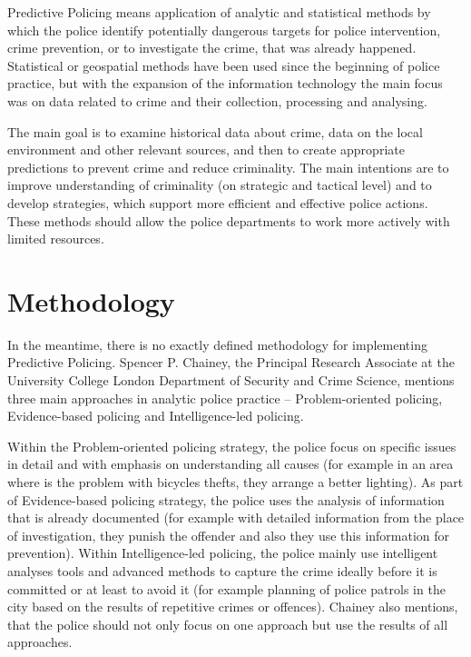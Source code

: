 \documentclass[thesis=M,english]{FITthesis}[2012/10/20]
\begin{document}
Predictive Policing means application of analytic and statistical methods by which the police identify potentially dangerous targets for police intervention, crime prevention, or to investigate the crime, that was already happened.\cite[xiii]{PP13}  Statistical or geospatial methods have been used since the beginning of police practice, but with the expansion of the information technology the main focus was on data related to crime and their collection, processing and analysing.

The main goal is to examine historical data about crime, data on the local environment and other relevant sources, and then to create appropriate predictions to prevent crime and reduce criminality. The main intentions are to improve understanding of criminality (on strategic and tactical level) and to develop strategies, which support more efficient and effective police actions. These methods should allow the police departments to work more actively with limited resources.\cite[xiv]{PP13}

\section{Methodology}\label{sec:methodology}

In the meantime, there is no exactly defined methodology for implementing Predictive Policing. Spencer P. Chainey, the Principal Research Associate at the University College London Department of Security and Crime Science, mentions three main approaches in analytic police practice -- Problem-oriented policing, Evidence-based policing and Intelligence-led policing.\cite[13]{Chainey2015maps}

Within the Problem-oriented policing strategy, the police focus on specific issues in detail and with emphasis on understanding all causes (for example in an area where is the problem with bicycles thefts, they arrange a better lighting). As part of Evidence-based policing strategy, the police uses the analysis of information that is already documented (for example with detailed information from the place of investigation, they punish the offender and also they use this information for prevention). Within Intelligence-led policing, the police mainly use intelligent analyses tools and advanced methods to capture the crime ideally before it is committed or at least to avoid it (for example planning of police patrols in the city based on the results of repetitive crimes or offences). Chainey also mentions, that the police should not only focus on one approach but use the results of all approaches.\cite[13--16]{Chainey2015maps}
\end{document}
